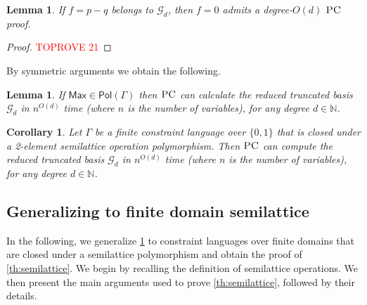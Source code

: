 \documentclass[11pt]{article}
\newcommand{\Pol}{\textsf{Pol}}
\newcommand{\PC}{\textsc{PC}}
\newcommand{\Max}{\textsf{Max}}
\newcommand{\1}{\textbf{1}}
\newcommand{\GB}{\text{Gr\"{o}bner} }
\newtheorem{lemma}[theorem]{Lemma}
\newtheorem{corollary}[theorem]{Corollary}
\begin{document}
\begin{lemma}\label{th:f_sos}
If $f=p-q$ belongs to $\mathcal{G}_d$, then $f=0$ admits a degree-$O(d)$ $\PC$ proof.
\end{lemma}
\begin{proof}\textcolor{red}{TOPROVE 21}\end{proof}
By symmetric arguments we obtain the following.
\begin{lemma}\label{th:Max}
If $\Max\in\Pol(\Gamma)$ then $\PC$ can calculate the reduced truncated basis \GB $\mathcal{G}_d$ in $n^{O(d)}$ time (where $n$ is the number of variables), for any degree $d\in \mathbb{N}$.
\end{lemma}
\begin{corollary}\label{th:2semilattice}
    Let $\Gamma$ be a finite constraint language over $\{0, 1\}$ that is closed under  a 2-element semilattice operation polymorphism. Then $\PC$ can compute the reduced truncated \GB basis $\mathcal{G}_d$ in $n^{O(d)}$ time (where $n$ is the number of variables), for any degree $d\in \mathbb{N}$.
\end{corollary}



\subsection{Generalizing to finite domain semilattice}
In the following, we generalize \cref{th:2semilattice} to constraint languages over finite domains that are closed under a semilattice polymorphism and obtain the proof of \cref{th:semilattice}. We begin by recalling the definition of semilattice operations. We then present the main arguments used to prove \cref{th:semilattice}, followed by their details.
\end{document}
